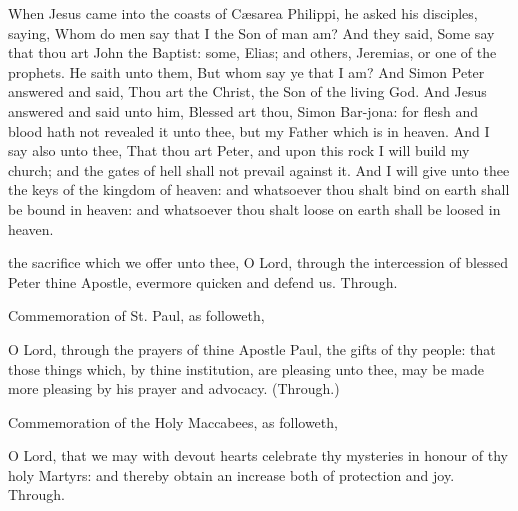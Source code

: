 
 When Jesus came into the coasts of C{\ae}sarea Philippi, he asked his disciples, saying, Whom do men say that I the Son of man am? And they said, Some say that thou art John the Baptist: some, Elias; and others, Jeremias, or one of the prophets. He saith unto them, But whom say ye that I am? And Simon Peter answered and said, Thou art the Christ, the Son of the living God. And Jesus answered and said unto him, Blessed art thou, Simon Bar-jona: for flesh and blood hath not revealed it unto thee, but my Father which is in heaven. And I say also unto thee, That thou art Peter, and upon this rock I will build my church; and the gates of hell shall not prevail against it. And I will give unto thee the keys of the kingdom of heaven: and whatsoever thou shalt bind on earth shall be bound in heaven: and whatsoever thou shalt loose on earth shall be loosed in heaven.


\secret
{} the sacrifice which we offer unto thee, O Lord, through the intercession of blessed Peter thine Apostle, evermore quicken and defend us. Through.

\begin{rubric}
	 Commemoration of St. Paul, as followeth,
\end{rubric}
 O Lord, through the prayers of thine Apostle Paul, the gifts of thy people: that those things which, by thine institution, are pleasing unto thee, may be made more pleasing by his prayer and advocacy. (Through.)

\begin{rubric}
	 Commemoration of the Holy Maccabees, as followeth,
\end{rubric}
 O Lord, that we may with devout hearts celebrate thy mysteries in honour of thy holy Martyrs: and thereby obtain an increase both of protection and joy. Through.


